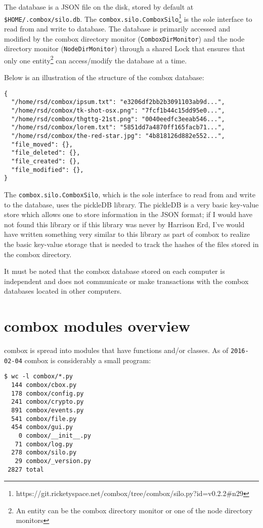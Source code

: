 The database is a JSON file on the disk, stored by default at
\verb+$HOME/.combox/silo.db+. The
\verb+combox.silo.ComboxSilo+\footnote{https://git.ricketyspace.net/combox/tree/combox/silo.py?id=v0.2.2\#n29}
is the sole interface to read from and write to database. The database
is primarily accessed and modified by the combox directory monitor
(\verb+ComboxDirMonitor+) and the node directory monitor
(\verb+NodeDirMonitor+) through a shared Lock\cite{py:threading.Lock}
that ensures that only one entity\footnote{An entity can be the combox
  directory monitor or one of the node directory monitors} can
access/modify the database at a time.

Below is an illustration of the structure of the combox database:

\begin{verbatim}
{
  "/home/rsd/combox/ipsum.txt": "e3206df2bb2b3091103ab9d...",
  "/home/rsd/combox/tk-shot-osx.png": "7fcf1b44c15dd95e0...",
  "/home/rsd/combox/thgttg-21st.png": "0040eedfc3eeab546...",
  "/home/rsd/combox/lorem.txt": "5851dd7a4870ff165facb71...",
  "/home/rsd/combox/the-red-star.jpg": "4b818126d882e552...",
  "file_moved": {},
  "file_deleted": {},
  "file_created": {},
  "file_modified": {},
}
\end{verbatim}

The \verb+combox.silo.ComboxSilo+, which is the sole interface to read
from and write to the database, uses the pickleDB
library\cite{pylib:pickledb}. The pickleDB is a very basic key-value
store which allows one to store information in the JSON format; if I
would have not found this library or if this library was never by
Harrison Erd, I've would have written something very similar to this
library as part of combox to realize the basic key-value storage that
is needed to track the hashes of the files stored in the combox
directory.

It must be noted that the combox database stored on each computer is
independent and does not communicate or make transactions with the
combox databases located in other computers.

\section{combox modules overview}

combox is spread into modules that have functions and/or classes. As
of \verb+2016-02-04+ combox is considerably a small program:

\begin{verbatim}
$ wc -l combox/*.py
  144 combox/cbox.py
  178 combox/config.py
  241 combox/crypto.py
  891 combox/events.py
  541 combox/file.py
  454 combox/gui.py
    0 combox/__init__.py
   71 combox/log.py
  278 combox/silo.py
   29 combox/_version.py
 2827 total
\end{verbatim}

